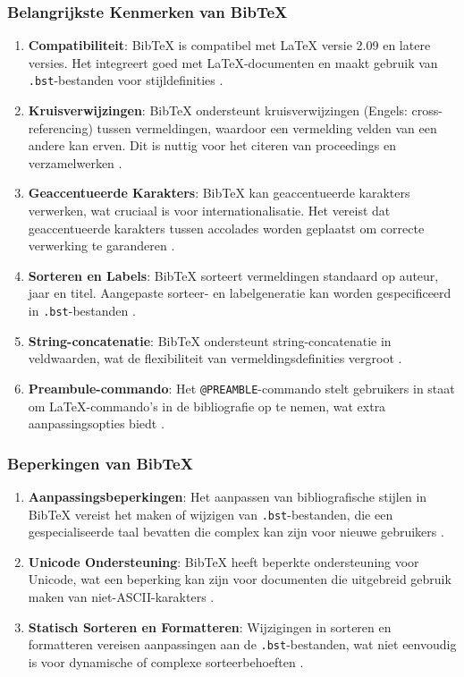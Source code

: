 \subsubsection{Belangrijkste Kenmerken van BibTeX}
\begin{enumerate}
    \item \textbf{Compatibiliteit}: BibTeX is compatibel met \LaTeX{} versie 2.09 en latere versies. Het integreert goed met \LaTeX{}-documenten en maakt gebruik van \texttt{.bst}-bestanden voor stijldefinities \autocite{Patashnik1988}.
    \item \textbf{Kruisverwijzingen}: BibTeX ondersteunt kruisverwijzingen (Engels: cross-referencing) tussen vermeldingen, waardoor een vermelding velden van een andere kan erven. Dit is nuttig voor het citeren van proceedings en verzamelwerken \autocite{Patashnik1988}.
    \item \textbf{Geaccentueerde Karakters}: BibTeX kan geaccentueerde karakters verwerken, wat cruciaal is voor internationalisatie. Het vereist dat geaccentueerde karakters tussen accolades worden geplaatst om correcte verwerking te garanderen \autocite{Patashnik1988}.
    \item \textbf{Sorteren en Labels}: BibTeX sorteert vermeldingen standaard op auteur, jaar en titel. Aangepaste sorteer- en labelgeneratie kan worden gespecificeerd in \texttt{.bst}-bestanden \autocite{Patashnik1988}.
    \item \textbf{String-concatenatie}: BibTeX ondersteunt string-concatenatie in veldwaarden, wat de flexibiliteit van vermeldingsdefinities vergroot \autocite{Patashnik1988}.
    \item \textbf{Preambule-commando}: Het \texttt{@PREAMBLE}-commando stelt gebruikers in staat om \LaTeX{}-commando's in de bibliografie op te nemen, wat extra aanpassingsopties biedt \autocite{Patashnik1988}.
\end{enumerate}

\subsubsection{Beperkingen van BibTeX}
\begin{enumerate}
    \item \textbf{Aanpassingsbeperkingen}: Het aanpassen van bibliografische stijlen in BibTeX vereist het maken of wijzigen van \texttt{.bst}-bestanden, die een gespecialiseerde taal bevatten die complex kan zijn voor nieuwe gebruikers \autocite{Patashnik1988}.
    \item \textbf{Unicode Ondersteuning}: BibTeX heeft beperkte ondersteuning voor Unicode, wat een beperking kan zijn voor documenten die uitgebreid gebruik maken van niet-ASCII-karakters \autocite{Patashnik1988}.
    \item \textbf{Statisch Sorteren en Formatteren}: Wijzigingen in sorteren en formatteren vereisen aanpassingen aan de \texttt{.bst}-bestanden, wat niet eenvoudig is voor dynamische of complexe sorteerbehoeften \autocite{Patashnik1988}.
\end{enumerate}

